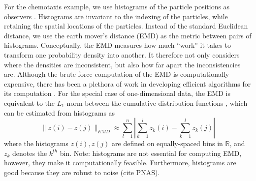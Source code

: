 \documentclass[preprint]{elsarticle}
\begin{document}
For the chemotaxis example, we use histograms of the particle positions as observers \cite{talmon2013empirical}. 
%
Histograms are invariant to the indexing of the particles, while retaining the spatial locations of the particles.
%
Instead of the standard Euclidean distance, we use the earth mover's distance (EMD) \cite{rubner2000earth} as the metric between pairs of histograms. 
%
Conceptually, the EMD measures how much ``work'' it takes to transform one probability density into another.
%
It therefore not only considers where the densities are inconsistent, but also how far apart the inconsistencies are.
%
Although the brute-force computation of the EMD is computationally expensive, there has been a plethora of work in developing efficient algorithms for its computation \cite{Pele-eccv2008, Pele-iccv2009}.
%
For the special case of one-dimensional data, the EMD is equivalent to the $L_1$-norm between the cumulative distribution functions \cite{rubner2000perceptual}, which can be estimated from histograms as
\begin{equation}
\| z(i) - z(j) \|_{EMD} \approx \sum_{l=1}^{n} \left| \sum_{k=1}^l z_k(i) - \sum_{k=1}^l z_k(j) \right|
\end{equation}
where the histograms $z(i), z(j)$ are defined on equally-spaced bins in $\mathbb{R}$, and $z_k$ denotes the $k^{th}$ bin. 
%
Note: histograms are not essential for computing EMD, however, they make it computationally feasible. Furthermore, histograms are good because they are robust to noise (cite PNAS). 
\end{document}
